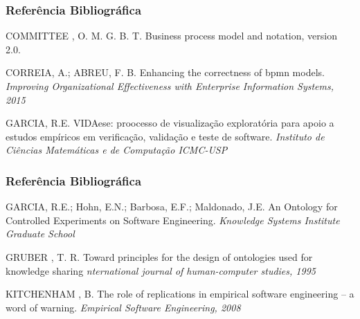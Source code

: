 \documentclass[aspectratio=169]{beamer}
\begin{document}
\begin{frame}
\frametitle{Referência Bibliográfica}
\footnotesize{
\begin{thebibliography}{99} %

 COMMITTEE , O. M. G. B. T.
\newblock Business process model and notation, version 2.0.

 CORREIA, A.; ABREU, F. B. 
\newblock Enhancing the correctness of bpmn models.
\newblock \emph{Improving Organizational Effectiveness with Enterprise Information Systems, 2015}


 GARCIA, R.E.
\newblock VIDAese: proocesso de visualização exploratória para apoio a estudos empíricos em verificação, validação e teste de software.
\newblock \emph{Instituto de Ciências Matemáticas e de Computação ICMC-USP}


\end{thebibliography}
}
\end{frame}

\begin{frame}
\frametitle{Referência Bibliográfica}
\footnotesize{
\begin{thebibliography}{99} %

 GARCIA, R.E.; Hohn, E.N.; Barbosa, E.F.; Maldonado, J.E.
\newblock An Ontology for Controlled Experiments on Software Engineering.
\newblock \emph{Knowledge Systems Institute Graduate School}

 GRUBER , T. R.
\newblock Toward principles for the design of ontologies used for knowledge sharing
\newblock \emph{nternational journal of human-computer studies, 1995}

 KITCHENHAM , B.
\newblock The role of replications in empirical software engineering -- a word of warning.
\newblock \emph{Empirical Software Engineering, 2008}

\end{thebibliography}
}
\end{frame}
\end{document}
